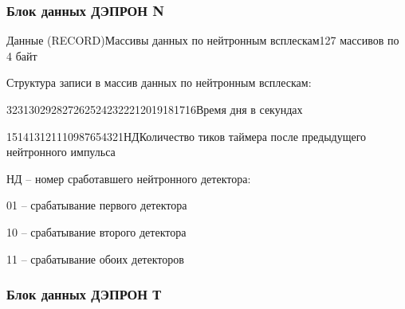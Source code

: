 \documentclass[a4paper,portrait,12pt]{article}
\begin{document}
{{{{\begin{flushleft}
\end{flushleft}


\subsubsection*{\textbf{Блок данных ДЭПРОН N}}

\begin{flushleft}

\end{flushleft}


{\footnotesize Данные (RECORD)Массивы данных по нейтронным всплескам127 массивов  по 4 байт}


\begin{flushleft}
Структура записи в массив данных по нейтронным всплескам:
\end{flushleft}


3231302928272625242322212019181716{\small Время дня в секундах}


\begin{flushleft}

\end{flushleft}


151413121110987654321{\small НДКоличество тиков таймера после предыдущего нейтронного импульса}


\begin{flushleft}

\end{flushleft}


\begin{flushleft}
НД -- номер сработавшего нейтронного детектора:
\end{flushleft}


\begin{flushleft}
01 -- срабатывание первого детектора
\end{flushleft}


\begin{flushleft}
10 -- срабатывание второго детектора
\end{flushleft}


\begin{flushleft}
11 -- срабатывание обоих детекторов
\end{flushleft}


\begin{flushleft}

\end{flushleft}


\subsubsection*{\textbf{\newpage
Блок данных ДЭПРОН Т}}

}}}}
\end{document}
